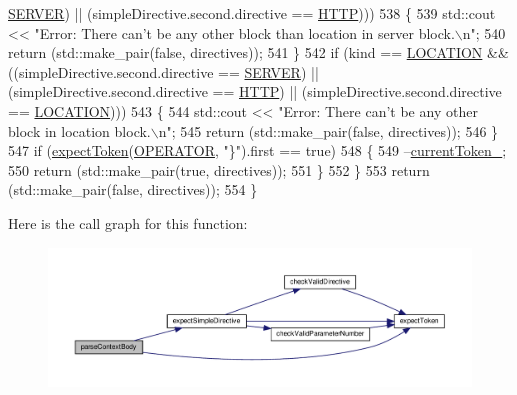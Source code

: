 \begin{DoxyCode}
      \hyperlink{namespaceft_a5a5554dff10f0dc50bae4cc5825ad75da67c96b24b23bcb408bae7626730a04b7}{SERVER}) || (simpleDirective.second.directive == \hyperlink{namespaceft_a5a5554dff10f0dc50bae4cc5825ad75da67e044074f46e6cea22788527da5f02e}{HTTP})))
538             \{
539                 std::cout << \textcolor{stringliteral}{"Error: There can't be any other block than location in server block.\(\backslash\)n"};
540                 \textcolor{keywordflow}{return} (std::make\_pair(\textcolor{keyword}{false}, directives));
541             \}
542             \textcolor{keywordflow}{if} (kind == \hyperlink{namespaceft_a5a5554dff10f0dc50bae4cc5825ad75da1e9e3944b93fde52c7c92e1e15dcaf4a}{LOCATION} && ((simpleDirective.second.directive == 
      \hyperlink{namespaceft_a5a5554dff10f0dc50bae4cc5825ad75da67c96b24b23bcb408bae7626730a04b7}{SERVER}) || (simpleDirective.second.directive == \hyperlink{namespaceft_a5a5554dff10f0dc50bae4cc5825ad75da67e044074f46e6cea22788527da5f02e}{HTTP}) || (simpleDirective.second.directive == 
      \hyperlink{namespaceft_a5a5554dff10f0dc50bae4cc5825ad75da1e9e3944b93fde52c7c92e1e15dcaf4a}{LOCATION})))
543             \{
544                 std::cout << \textcolor{stringliteral}{"Error: There can't be any other block in location block.\(\backslash\)n"};
545                 \textcolor{keywordflow}{return} (std::make\_pair(\textcolor{keyword}{false}, directives));
546             \}
547             \textcolor{keywordflow}{if} (\hyperlink{classft_1_1_parser_a1615a752d3642bb53598e2c8db810db0}{expectToken}(\hyperlink{namespaceft_aa520fbf142ba1e7e659590c07da31921a6411d9d6073252e4d316493506bbb979}{OPERATOR}, \textcolor{stringliteral}{"\}"}).first == \textcolor{keyword}{true})
548             \{
549                 --\hyperlink{classft_1_1_parser_a942c5b794d108f144c5b5028aaa34cb6}{currentToken\_};
550                 \textcolor{keywordflow}{return} (std::make\_pair(\textcolor{keyword}{true}, directives));
551             \}
552         \}
553         \textcolor{keywordflow}{return} (std::make\_pair(\textcolor{keyword}{false}, directives));
554     \}
\end{DoxyCode}
Here is the call graph for this function\+:
\nopagebreak
\begin{figure}[H]
\begin{center}
\leavevmode
\includegraphics[width=350pt]{classft_1_1_parser_a2d0fd9222eca5d8ea7e8fbb79f0a30be_cgraph}
\end{center}
\end{figure}
